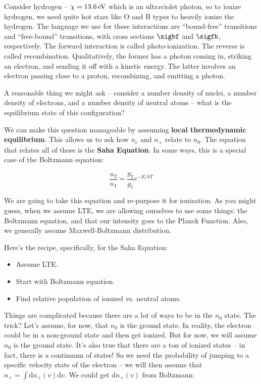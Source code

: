 \documentclass{article}
\newcommand{\unit}[1]{{\,\rm #1}}
\newcommand{\ev}{\unit{eV}}
\begin{document}
Consider hydrogen -- $\chi = 13.6 \ev$ which is an ultraviolet photon, so to ionize hydrogen, we need quite hot stars like O and B types to heavily ionize the hydrogen. The language we use for these interactions are ``bound-free'' transitions and ``free-bound'' transitions, with cross sections $\sigbf$ and $\sigfb$, respectively. The forward interaction is called photo-ionization. The reverse is called recombination. Qualitatively, the former has a photon coming in, striking an electron, and sending it off with a kinetic energy. The latter involves an electron passing close to a proton, recombining, and emitting a photon. 

A reasonable thing we might ask -- consider a number density of nuclei, a number density of electrons, and a number density of neutral atoms -- what is the equilibrium state of this configuration? 

We can make this question manageable by asssuming \textbf{local thermodynamic equilibrium}. This allows us to ask how $n_e$ and $n_+$ relate to $n_0$. The equation that relates all of these is the \textbf{Saha Equation}. In some ways, this is a special case of the Boltzmann equation:

$$
\frac{n_2}{n_1} = \frac{g_2}{g_1} e^{-E/kT}
$$

We are going to take this equation and re-purpose it for ionization. As you might guess, when we assume LTE, we are allowing ourselves to use some things: the Boltzmann equation, and that our intensity goes to the Planck Function. Also, we generally assume Maxwell-Boltzmann distribution. 

Here's the recipe, specifically, for the Saha Equation: 
\begin{itemize}
    \item Assume LTE.
    \item Start with Boltzmann equation.
    \item Find relative population of ionized vs. neutral atoms. 
\end{itemize}

Things are complicated because there are a lot of ways to be in the $n_0$ state. The trick? Let's assume, for now, that $n_0$ is the ground state. In reality, the electron could be in a non-ground state and then get ionized. But for now, we will assume $n_0$ is the ground state. It's also true that there are a ton of ionized states -- in fact, there is a continuum of states! So we need the probability of jumping to a specific velocity state of the electron -- we will then assume that $n_+ = \int \mathrm{d}n_+(v) \mathrm{d}v$. We could get $\mathrm{d}n_+(v)$ from Boltzmann:
\end{document}
